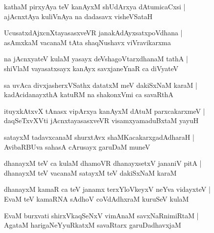 \begin{shloka}
kathaM pirxyAya teV kanAyxM shUdArxya dAtumicaCxsi |\\
ajAcnxtAya kuliVnAya na dadasavx visheVSataH 
\end{shloka}

\begin{shloka}
UcusatxdAjxcnXtayasasxveVR janakAdAyxsatxpoVdhana |\\
asAmxkaM vacanaM tAta shaqNushavx viVravikarxma
\end{shloka}

\begin{shloka}
na jAcnxyateV kulaM yasayx deVshagoVtarxdhanaM tathA |\\
shiVlaM vayasatxsayx kanAyx savxjaneYnaR ca diVyateV 
\end{shloka}

\begin{shloka}
sa uvAca divxjasherxVSathx datatxM meV dakiSxNaM karaM |\\
kadAcidanayxthA katuRM na shakonxVmi ca savaRthA
\end{shloka}

\begin{shloka}
ituyxkAtxvX tAnasx vipArxya kanAyxM dAtuM parxcakarxmeV |\\
daqSeTxvXVti jAcnxtayasasxveVR visamxyamaduBxtaM yayuH 
\end{shloka}

\begin{shloka}
satayxM tadavxcanaM shurxtAvx shaMKacakarxgadAdharaH |\\
AvibaRBUva sahasA cArusayx garuDaM muneV
\end{shloka}

\begin{shloka}
dhanayxM teV ca kulaM dhamoVR dhanayxsetxV jananiV pitA |\\
dhanayxM teV vacanaM satayxM teV dakiSxNaM karaM
\end{shloka}

\begin{shloka}
dhanayxM kamaR ca teV janamx terxYloVkeyxV neYva vidayxteV |\\
EvaM teV kamaRNA sAdhoV coVdAdhxraM kuruSeV kulaM
\end{shloka}

\begin{shloka}
EvaM burxvati shirxVkaqSeNxV vimAnaM savxNaRnimiRtaM |\\
AgataM harigaNeYyuRkatxM savaRtarx garuDadhavxjaM
\end{shloka}

